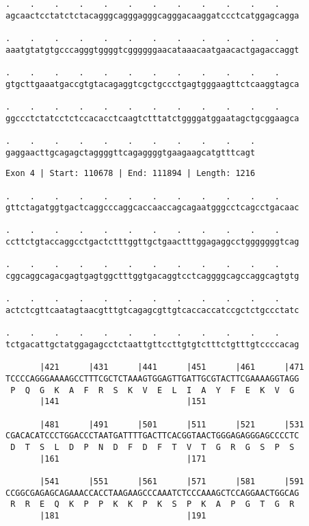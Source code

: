\documentclass{article}
\begin{document}
\begin{Verbatim}
.    .    .    .    .    .    .    .    .    .    .    .    
agcaactcctatctctacagggcagggagggcagggacaaggatccctcatggagcagga
  
.    .    .    .    .    .    .    .    .    .    .    .    
aaatgtatgtgcccagggtggggtcggggggaacataaacaatgaacactgagaccaggt
  
.    .    .    .    .    .    .    .    .    .    .    .    
gtgcttgaaatgaccgtgtacagaggtcgctgccctgagtgggaagttctcaaggtagca
  
.    .    .    .    .    .    .    .    .    .    .    .    
ggccctctatcctctccacacctcaagtctttatctggggatggaatagctgcggaagca
  
.    .    .    .    .    .    .    .    .    .    .
gaggaacttgcagagctaggggttcagaggggtgaagaagcatgtttcagt
\end{Verbatim}
\newpage
\begin{Verbatim}
Exon 4 | Start: 110678 | End: 111894 | Length: 1216
 
.    .    .    .    .    .    .    .    .    .    .    .    
gttctagatggtgactcaggcccaggcaccaaccagcagaatgggcctcagcctgacaac
  
.    .    .    .    .    .    .    .    .    .    .    .    
ccttctgtaccaggcctgactctttggttgctgaactttggagaggcctgggggggtcag
  
.    .    .    .    .    .    .    .    .    .    .    .    
cggcaggcagacgagtgagtggctttggtgacaggtcctcaggggcagccaggcagtgtg
  
.    .    .    .    .    .    .    .    .    .    .    .    
actctcgttcaatagtaacgtttgtcagagcgttgtcaccaccatccgctctgccctatc
  
.    .    .    .    .    .    .    .    .    .    .    .    
tctgacattgctatggagagcctctaattgttccttgtgtctttctgtttgtccccacag
  
       |421      |431      |441      |451      |461      |471
TCCCCAGGGAAAAGCCTTTCGCTCTAAAGTGGAGTTGATTGCGTACTTCGAAAAGGTAGG
 P  Q  G  K  A  F  R  S  K  V  E  L  I  A  Y  F  E  K  V  G 
       |141                          |151                   
  
       |481      |491      |501      |511      |521      |531
CGACACATCCCTGGACCCTAATGATTTTGACTTCACGGTAACTGGGAGAGGGAGCCCCTC
 D  T  S  L  D  P  N  D  F  D  F  T  V  T  G  R  G  S  P  S 
       |161                          |171                   
  
       |541      |551      |561      |571      |581      |591
CCGGCGAGAGCAGAAACCACCTAAGAAGCCCAAATCTCCCAAAGCTCCAGGAACTGGCAG
 R  R  E  Q  K  P  P  K  K  P  K  S  P  K  A  P  G  T  G  R 
       |181                          |191                   
  

\end{Verbatim}
\end{document}
